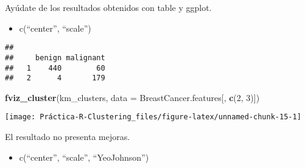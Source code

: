 \documentclass[
]{article}
\newenvironment{Shaded}{\begin{snugshade}}{\end{snugshade}}
\newcommand{\CommentTok}[1]{\textcolor[rgb]{0.56,0.35,0.01}{\textit{#1}}}
\newcommand{\DataTypeTok}[1]{\textcolor[rgb]{0.13,0.29,0.53}{#1}}
\newcommand{\DecValTok}[1]{\textcolor[rgb]{0.00,0.00,0.81}{#1}}
\newcommand{\KeywordTok}[1]{\textcolor[rgb]{0.13,0.29,0.53}{\textbf{#1}}}
\newcommand{\NormalTok}[1]{#1}
\newcommand{\OperatorTok}[1]{\textcolor[rgb]{0.81,0.36,0.00}{\textbf{#1}}}
\newcommand{\StringTok}[1]{\textcolor[rgb]{0.31,0.60,0.02}{#1}}
\providecommand{\tightlist}{%
  \setlength{\itemsep}{0pt}\setlength{\parskip}{0pt}}
\begin{document}
Ayúdate de los resultados obtenidos con table y ggplot.

\begin{itemize}
\tightlist
\item
  c(``center'', ``scale'')
\end{itemize}

\begin{Shaded}
\end{Shaded}

\begin{verbatim}
##    
##     benign malignant
##   1    440        60
##   2      4       179
\end{verbatim}

\begin{Shaded}
\begin{Highlighting}[]
\KeywordTok{fviz_cluster}\NormalTok{(km_clusters, }\DataTypeTok{data =}\NormalTok{ BreastCancer.features[, }\KeywordTok{c}\NormalTok{(}\DecValTok{2}\NormalTok{, }\DecValTok{3}\NormalTok{)])}
\end{Highlighting}
\end{Shaded}

\begin{center}\texttt{[image: Práctica-R-Clustering\_files/figure-latex/unnamed-chunk-15-1]} \end{center}

El resultado no presenta mejoras.

\begin{itemize}
\tightlist
\item
  c(``center'', ``scale'', ``YeoJohnson'')
\end{itemize}
\end{document}
